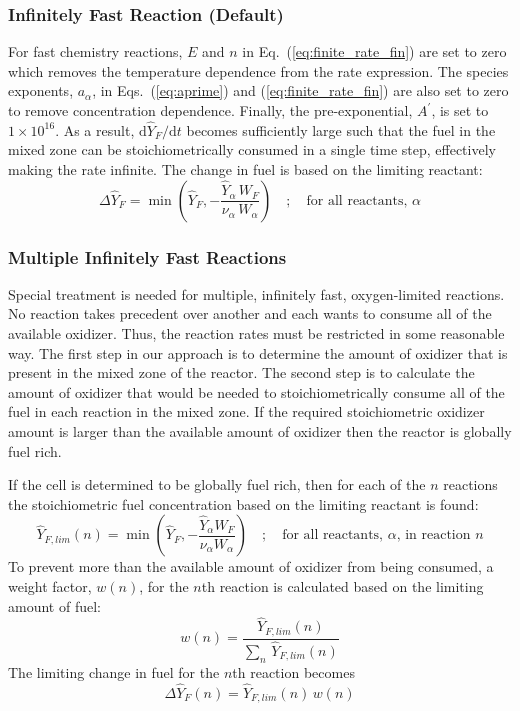 \subsubsection{Infinitely Fast Reaction (Default)}
For fast chemistry reactions, $E$ and $n$ in Eq.~(\ref{eq:finite_rate_fin}) are set to zero which removes the temperature dependence from the rate expression. The species exponents, $a_{\alpha}$, in Eqs.~(\ref{eq:aprime}) and (\ref{eq:finite_rate_fin}) are also set to zero to remove concentration dependence. Finally, the pre-exponential, $A^{\prime}$, is set to $1 \times 10^{16}$. As a result, $\mbox{d}\hat{Y}_F/\mbox{d}t$ becomes sufficiently large such that the fuel in the mixed zone can be stoichiometrically consumed in a single time step, effectively making the rate infinite. The change in fuel is based on the limiting reactant: 
\begin{equation}\label{eq:stoich_fuel_single}
\Delta \hat{Y}_{F} = \min \left (\hat{Y}_F,-\frac{\hat{Y}_{\alpha}\,W_{F}}{\nu_{\alpha}\,W_{\alpha}}\right) \quad ; \quad \mbox{for all reactants, $\alpha$}
\end{equation}

\subsubsection{Multiple Infinitely Fast Reactions}   
Special treatment is needed for multiple, infinitely fast, oxygen-limited reactions. No reaction takes precedent over another and each wants to consume all of the available oxidizer.  Thus, the reaction rates must be restricted in some reasonable way. The first step in our approach is to determine the amount of oxidizer that is present in the mixed zone of the reactor. The second step is to calculate the amount of oxidizer that would be needed to stoichiometrically consume all of the fuel in each reaction in the mixed zone. If the required stoichiometric oxidizer amount is larger than the available amount of oxidizer then the reactor is globally fuel rich.

If the cell is determined to be globally fuel rich, then for each of the $n$ reactions the stoichiometric fuel concentration based on the limiting reactant is found:
\begin{equation}\label{eq:stoich_fuel}
\hat{Y}_{F,lim}(n) = \min \left (\hat{Y}_F,-\frac{\hat{Y}_{\alpha}W_{F}}{\nu_{\alpha} W_{\alpha}}\right) \quad ; \quad \mbox{for all reactants, $\alpha$, in reaction $n$}
\end{equation}
To prevent more than the available amount of oxidizer from being consumed, a weight factor, $w(n)$, for the $n$th reaction is calculated based on the limiting amount of fuel:
\begin{equation}\label{eq:fuel_weight}
w(n) = \frac{\hat{Y}_{F,lim}(n)}{\sum_n \, \hat{Y}_{F,lim}(n)}
\end{equation}
The limiting change in fuel for the $n$th reaction becomes
\begin{equation}\label{eq:fuel_rate}
\Delta \hat{Y}_{F}(n) = \hat{Y}_{F,lim}(n)\,w(n)
\end{equation}


